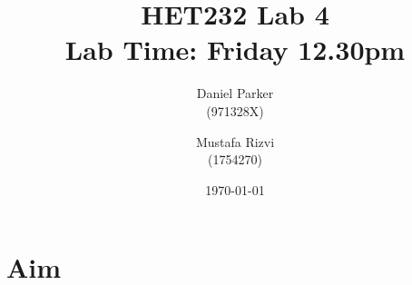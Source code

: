 \documentclass{article}
\title{HET232 Lab 4 \\ Lab Time: Friday 12.30pm}
\author{
    Daniel Parker \\ (971328X) \and Mustafa Rizvi \\ (1754270)
}
\date{\today}
\begin{document}
\maketitle
\section{Aim}

\maketitle
\section{}
\end{document}
